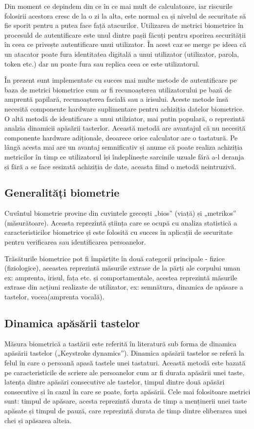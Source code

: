 \documentclass[9pt,shortpaper,twoside,web]{ieeecolor}
\begin{document}
	Din moment ce depindem din ce în ce mai mult de calculatoare, iar riscurile folosirii acestora cresc de la o zi la alta, este normal ca și nivelul de securitate să fie sporit pentru a putea face față atacurilor. Utilizarea de metrici biometrice în procesuld de autentificare este unul dintre pașii făcuți pentru sporirea securității în ceea ce privește autentificare unui utilizator. În acest caz se merge pe ideea că un atacator poate fura identitatea digitală a unui utilizator (utilizator, parola, token etc.) dar nu poate fura sau replica ceea ce este utilizatorul.

	În prezent sunt implementate cu succes mai multe metode de autentificare pe baza de metrici biometrice cum ar fi recunoașterea utilizatorului pe bază de amprentă papilară, recunoașterea facială sau a irisului. Aceste metode însă necesită componente hardware suplimentare pentru achiziția datelor biometrice. O altă metodă de identificare a unui utilziator, mai putin populară, o reprezintă analzia dinamicii apăsării tasterlor. Această metodă are avantajul că nu necesită componente hardware adiționale, deoarece orice calculator are o tastatură. Pe lângă acesta mai are un avantaj semnificativ și anume că poate realiza achiziția metricilor în timp ce utilizatorul își îndeplinește sarcinile uzuale fără a-l deranja și fără a se face sesizată achiziția de date, aceasta fiind o metodă neintruzivă.


\subsection{Generalități biometrie}
	Cuvântul biometrie provine din cuvintele grecești „bios” (viață) și „metrikos” (măsurătoare). Aceasta reprezintă știința care se ocupă cu analiza statistică a caracteristicilor biometrice și este folosită cu succes în aplicații de securitate pentru verificarea sau identificarea persoanelor.

	Trăsăturile biometrice pot fi împărțite în două categorii principale - fizice (fiziologice), aceastea reprezintă măsurile extrase de la părți ale corpului uman ex: amprenta, irisul, fața etc. și comportamentale, acestea reprezintă măsurile extrase din acțiuni realizate de utilizator, ex: semnătura, dinamica de apăsare a tastelor, vocea(amprenta vocală).
	
	
\subsection{Dinamica apăsării tastelor}
	Măsura biometrică a tastării este referită în literatură sub forma de dinamica apăsării tastelor („Keystroke dynamics”). Dinamica apăsării tastelor se referă la felul în care o persoană apasă tastele unei tastaturi. Această metodă este bazată pe caracteristicile de scriere ale persoanelor cum ar fi durata apăsării unei taste, latența dintre apăsări consecutive ale tastelor, timpul dintre două apăsări consecutive și în cazul în care se poate, forța apăsării. Cele mai folositoare metrici sunt: timpul de apăsare, acesta reprezintă durata de timp a menținerii unei taste apăsate și timpul de pauză, care reprezintă durata de timp dintre eliberarea unei chei și apăsarea alteia.
\end{document}

